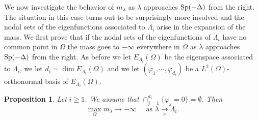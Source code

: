 \documentclass[10pt]{amsart}
\numberwithin{equation}{section}
\newcommand{\Sp}{{\rm Sp}}
\newcommand{\vp}{\varphi}
\newcommand{\Om}{\Omega}
\theoremstyle{plain}
\newtheorem{prop}{Proposition}[section]%
\theoremstyle{remark}
\begin{document}
We now investigate the behavior of $m_{\lambda}$ as $\lambda$ approaches $\Sp(-\Delta)$ from the right. The situation in this case turns out to be surprisingly more involved and the nodal sets of the eigenfunctions associated to $\Lambda_i$ arise in the expansion of the mass. We first prove that if the nodal sets of the eigenfunctions of $\Lambda_i$ have no common point in $\Om$ the mass goes to $-\infty$ everywhere in $\Om$ as $\lambda$ approaches $\Sp(-\Delta)$ from the right. As before we let $E_{\Lambda_{i}}(\Om)$ be the eigenspace associated to $\Lambda_{i}$, we let $d_i = \dim E_{\Lambda_{i}}(\Om)$ and we let $(\vp_1, \cdots, \vp_{d_i})$ be a $L^2(\Om)$-orthonormal basis of $E_{\Lambda_{i}}(\Om)$. 
  
  \begin{prop} \label{prop:massenegative}
Let $i \ge 1$. We assume that $\cap_{j=1}^{d_i} \{\vp_j = 0 \} = \emptyset$. Then
$$ \max_{\Om} m_\lambda \to - \infty \quad \text{ as } \lambda \underset{> }{\to} \Lambda_{i} . $$
\end{prop}
\end{document}
